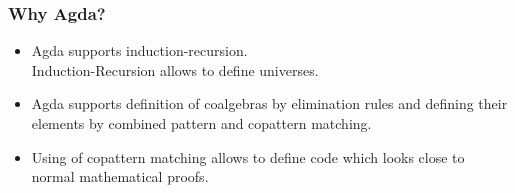 \documentclass{beamer}
\begin{document}




\begin{frame}
\frametitle{Why Agda?}
\begin{itemize}
 
\item Agda supports induction-recursion. \\ {\footnotesize Induction-Recursion allows to define universes.}

\item Agda supports definition of coalgebras by elimination rules and defining their elements by combined pattern and copattern matching.

\item Using of copattern matching allows to define code which looks close to normal mathematical proofs.

\end{itemize}
\end{frame}
\end{document}
